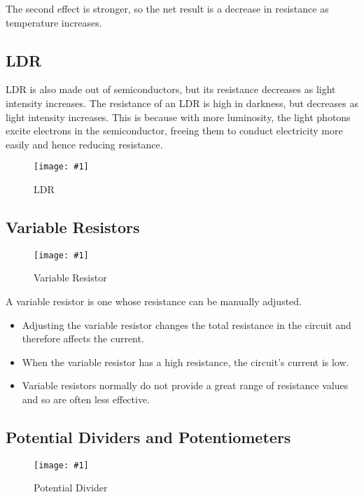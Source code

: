 \documentclass[a4paper,12pt]{article}
\newcommand{\img}[4]{\begin{center}
  \begin{figure}[H]
    \centering
    \texttt{[image: \#1]}
    \caption{#3}
    \label{fig:#4}
  \end{figure}
\end{center}}
\begin{document}
The second effect is stronger, so the net result is a decrease in resistance as temperature increases.

\subsection{LDR}

LDR is also made out of semiconductors, but its resistance decreases as light intensity increases. The resistance of an LDR is high in darkness, but decreases as light intensity increases. This is because with more luminosity, the light photons excite electrons in the semiconductor, freeing them to conduct electricity more easily and hence reducing resistance.

\img{ldr.png}{0.7}{LDR}{ldr}

\pagebreak

\subsection{Variable Resistors}

\img{varresistor.png}{0.4}{Variable Resistor}{varresistor}

A variable resistor is one whose resistance can be manually adjusted.
\begin{itemize}
  \item Adjusting the variable resistor changes the total resistance in the circuit and therefore affects the current.
  \item When the variable resistor has a high resistance, the circuit's current is low.
  \item Variable resistors normally do not provide a great range of resistance values and so are often less effective.
\end{itemize}

\pagebreak


\subsection{Potential Dividers and Potentiometers}

\img{potential_divider.png}{0.5}{Potential Divider}{potentialdivider}
\end{document}
